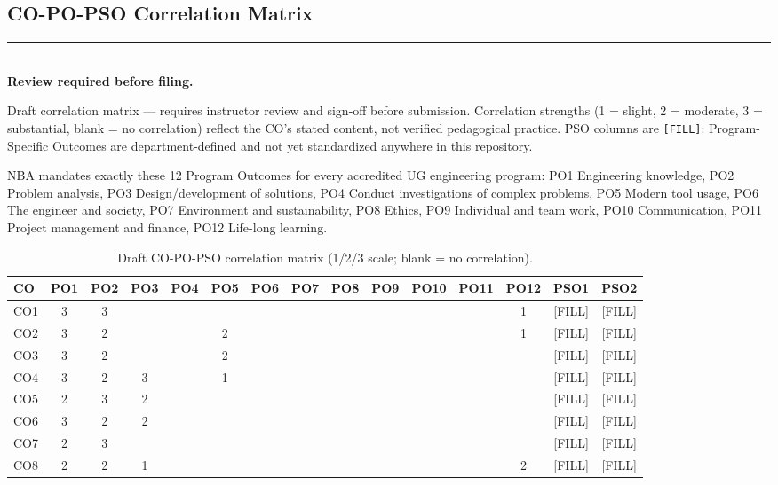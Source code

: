 \documentclass[11pt]{article}
\newenvironment{noticebox}{%
  \par\noindent\begin{minipage}{\linewidth}\vspace{0.4em}
  \textcolor{negative}{\rule{\linewidth}{1.2pt}}\\[0.3em]
  \textbf{\textcolor{negative}{Review required before filing.}}\ \itshape
}{%
  \end{minipage}\vspace{0.6em}\par
}
\begin{document}
\clearpage
\begin{landscape}
\section{CO-PO-PSO Correlation Matrix}
\label{sec:matrix}

\begin{noticebox}
Draft correlation matrix --- requires instructor review and sign-off before submission. Correlation strengths (1 = slight, 2 = moderate, 3 = substantial, blank = no correlation) reflect the CO's stated content, not verified pedagogical practice. PSO columns are \texttt{[FILL]}: Program-Specific Outcomes are department-defined and not yet standardized anywhere in this repository.
\end{noticebox}

NBA mandates exactly these 12 Program Outcomes for every accredited UG engineering program: PO1 Engineering knowledge, PO2 Problem analysis, PO3 Design/development of solutions, PO4 Conduct investigations of complex problems, PO5 Modern tool usage, PO6 The engineer and society, PO7 Environment and sustainability, PO8 Ethics, PO9 Individual and team work, PO10 Communication, PO11 Project management and finance, PO12 Life-long learning.

\begin{table}[h]
\centering
\small
\setlength{\tabcolsep}{4pt}
\begin{tabular}{@{}l cccccccccccc|cc@{}}
\toprule
CO & PO1 & PO2 & PO3 & PO4 & PO5 & PO6 & PO7 & PO8 & PO9 & PO10 & PO11 & PO12 & PSO1 & PSO2 \\
\midrule
CO1 & 3 & 3 &  &  &  &  &  &  &  &  &  & 1 & [FILL] & [FILL] \\
CO2 & 3 & 2 &  &  & 2 &  &  &  &  &  &  & 1 & [FILL] & [FILL] \\
CO3 & 3 & 2 &  &  & 2 &  &  &  &  &  &  &   & [FILL] & [FILL] \\
CO4 & 3 & 2 & 3 &  & 1 &  &  &  &  &  &  &   & [FILL] & [FILL] \\
CO5 & 2 & 3 & 2 &  &  &  &  &  &  &  &  &   & [FILL] & [FILL] \\
CO6 & 3 & 2 & 2 &  &  &  &  &  &  &  &  &   & [FILL] & [FILL] \\
CO7 & 2 & 3 &  &  &  &  &  &  &  &  &  &   & [FILL] & [FILL] \\
CO8 & 2 & 2 & 1 &  &  &  &  &  &  &  &  & 2 & [FILL] & [FILL] \\
\bottomrule
\end{tabular}
\caption{Draft CO-PO-PSO correlation matrix (1/2/3 scale; blank = no correlation).}
\label{tab:co-po-matrix}
\end{table}

\end{landscape}
\clearpage
\end{document}
